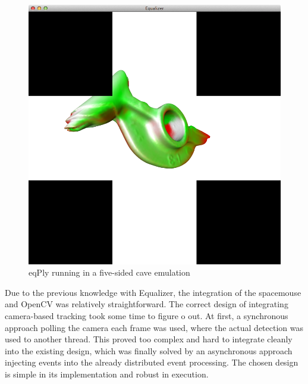 \documentclass[10pt,a4]{scrartcl}
\begin{document}
\begin{figure}
  \includegraphics[width=.312\textwidth]{screenshot}
  {\caption{\label{fScreenshot}eqPly running in a five-sided cave emulation}}
\end{figure}
Due to the previous knowledge with Equalizer, the integration of the spacemouse
and OpenCV was relatively straightforward. The correct design of integrating
camera-based tracking took some time to figure o out. At first, a synchronous
approach polling the camera each frame was used, where the actual detection was
used to another thread. This proved too complex and hard to integrate cleanly
into the existing design, which was finally solved by an asynchronous approach
injecting events into the already distributed event processing. The chosen
design is simple in its implementation and robust in execution.
\end{document}
